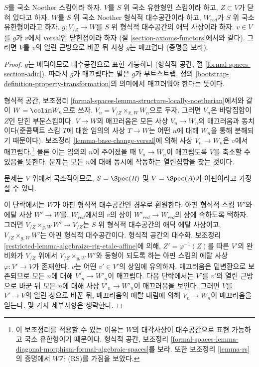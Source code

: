\begin{lemma}
\label{lemma-openness-smoothness}
$S$를 국소 Noether 스킴이라 하자. $V$를 $S$ 위 국소 유한형인
스킴이라 하고, $Z \subset V$가 닫혀 있다고 하자.
$W$를 $S$ 위 국소 Noether 형식적 대수공간이라 하고,
$W_{red}$가 $S$ 위 국소 유한형이라고 하자.
$g : V_{/Z} \to W$를 $S$ 위 형식적 대수공간의 애딕 사상이라 하자.
$v \in V$를 $g$가 $v$에서 versal인 닫힌점이라 하자
(절 \ref{section-axioms-functors}에서와 같다).
그러면 $V$를 $v$의 열린 근방으로 바꾼 뒤 사상 $g$는 매끄럽다
(증명을 보라).
\end{lemma}

\begin{proof}
$g$는 애딕이므로 대수공간으로 표현 가능하다
(형식적 공간, 절 \ref{formal-spaces-section-adic}).
따라서 $g$가 매끄럽다는 말은 $g$가 부트스트랩, 정의
\ref{bootstrap-definition-property-transformation}의 의미에서
매끄러워야 한다는 뜻이다.

\medskip\noindent
형식적 공간, 보조정리
\ref{formal-spaces-lemma-structure-locally-noetherian}에서와 같이
$W = \colim W_n$으로 쓰자.
$V_n = V_{/Z} \times_{\hat x, W} W_n$으로 두자.
그러면 $V_n$은 바탕집합이 $Z$인 닫힌 부분스킴이다.
$V \to W$의 매끄러움은 모든 사상 $V_n \to W_n$의 매끄러움과
동치이다(준콤팩트 스킴 $T$에 대한 임의의 사상 $T \to W$는
어떤 $n$에 대해 $W_n$을 통해 분해되기 때문이다).
보조정리 \ref{lemma-base-change-versal}에 의해
사상 $V_n \to W_n$은 $v$에서 매끄럽다.\footnote{이 보조정리를 적용할
수 있는 이유는 $W$의 대각사상이 대수공간으로 표현 가능하고
국소 유한형이기 때문이다. 형식적 공간, 보조정리
\ref{formal-spaces-lemma-diagonal-morphism-formal-algebraic-spaces}를 보라.
또한 보조정리 \ref{lemma-rs}의 증명에서 $W$가 (RS)를 가짐을 보았다.}
물론 이는 임의의 $n$이 주어졌을 때 $V_n \to W_n$이 매끄럽도록
$V$를 축소할 수 있음을 뜻한다. 문제는 모든 $n$에 대해 동시에
작동하는 열린집합을 찾는 것이다.

\medskip\noindent
문제는 $V$ 위에서 국소적이므로, $S = \Spec(R)$ 및
$V = \Spec(A)$가 아핀이라고 가정할 수 있다.

\medskip\noindent
이 단락에서는 $W$가 아핀 형식적 대수공간인 경우로 환원한다.
아핀 형식적 스킴 $W'$와 에탈 사상 $W' \to W$를,
$W_{red}$에서의 $v$의 상이 $W'_{red} \to W_{red}$의 상에
속하도록 택하자. 그러면 $V_{/Z} \times_{g, W} W' \to V_{/Z}$는
$S$ 위 형식적 대수공간의 애딕 에탈 사상이고,
$V_{/Z} \times_{g, W} W'$는 아핀 형식적 대수공간이다.
형식적 공간의 대수화, 보조정리
\ref{restricted-lemma-algebraize-rig-etale-affine}에 의해,
$Z' = \varphi^{-1}(Z)$를 따른 $V'$의 완비화가 $V_{/Z}$ 위에서
$V_{/Z} \times_{g, W} W'$와 동형이 되도록 하는 아핀 스킴의 에탈 사상
$\varphi : V' \to V$가 존재한다.
$v$는 어떤 $v' \in V'$의 상임에 유의하자.
매끄러움은 밑변환으로 보존되므로 모든 $n$에 대해
$V'_n \to W'_n$이 매끄럽다. 다음 단락에서는 $V'$를 $v'$의
열린 근방으로 바꾼 뒤 모든 $n$에 대해 사상
$V'_n \to W'_n$이 매끄러움을 보인다. 그러면 $V$를
$V' \to V$의 열린 상으로 바꾼 뒤, 매끄러움의 에탈 내림에 의해
$V_n \to W_n$이 매끄러움을 얻는다. 몇 가지 세부사항은 생략한다.


\end{proof}
